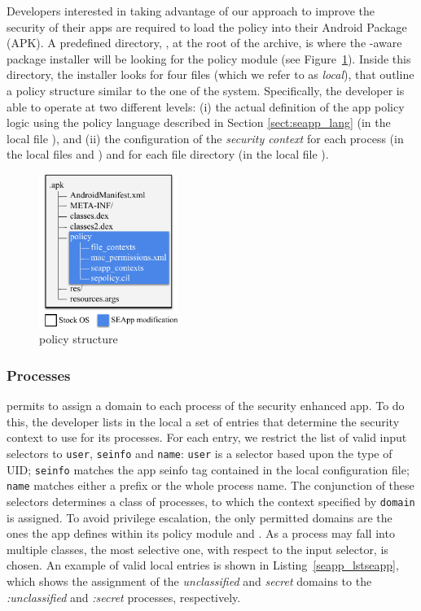 Developers interested in taking advantage of our approach to improve
the security of their apps are required to load the policy into their
Android Package (APK).  A predefined directory, \apkpolicydir, at the
root of the archive, is where the \pap-aware package installer will be
looking for the policy module (see
Figure~\ref{fig:seapp_policy_folder}).  Inside this directory, the
installer looks for four files (which we refer to as {\em local}),
that outline a policy structure similar to the one of the system.
Specifically, the developer is able to operate at two different
levels: (i) the actual definition of the app policy logic using the
policy language described in Section \ref{sect:seapp_lang} (in the
local file \sepolicy), and (ii) the configuration of the {\em security
  context} for each process (in the local files \seappcontexts and
\macpermissions) and for each file directory (in the local file
\filecontexts).

\begin{figure}[t]
	\centering
	\includegraphics[width=0.4\textwidth]{chapters/seapp/figs/policy_folder}
	\caption{\pap policy structure}
	\label{fig:seapp_policy_folder}
\end{figure}

\subsubsection{Processes}\label{subsub:seapp_process_control}

\pap permits to assign a \sel domain to each process of the security
enhanced app.  To do this, the developer lists in the local
\seappcontexts a set of entries that determine the security context to
use for its processes.  For each entry, we restrict the list of valid
input selectors to {\tt user}, {\tt seinfo} and {\tt name}: {\tt user}
is a selector based upon the type of UID; {\tt seinfo} matches the app
seinfo tag contained in the local \macpermissions configuration file;
{\tt name} matches either a prefix or the whole process name.  The
conjunction of these selectors determines a class of processes, to
which the context specified by {\tt domain} is assigned.  To avoid
privilege escalation, the only permitted domains are the ones the app
defines within its policy module and \untrustedapp. As a process may
fall into multiple classes, the most selective one, with respect to
the input selector, is chosen.  An example of valid local
\seappcontexts entries is shown in Listing~\ref{seapp_lstseapp}, which
shows the assignment of the {\em unclassified} and {\em secret}
domains to the {\em :unclassified} and {\em :secret} processes,
respectively.

